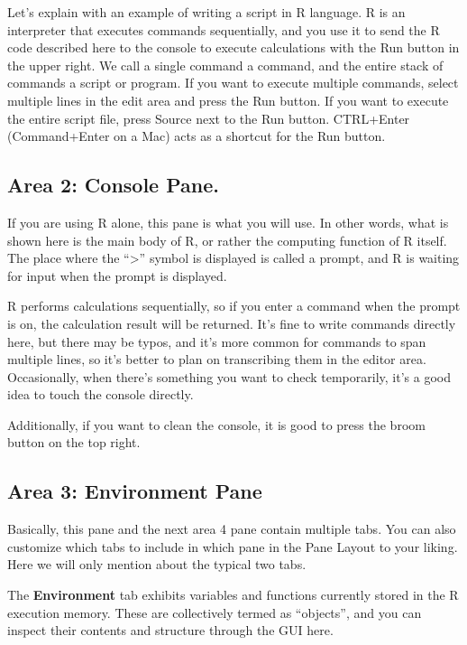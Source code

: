 \documentclass[
  a4paper,
]{book}
\begin{document}
Let's explain with an example of writing a script in R language. R is an
interpreter that executes commands sequentially, and you use it to send
the R code described here to the console to execute calculations with
the Run button in the upper right. We call a single command a command,
and the entire stack of commands a script or program. If you want to
execute multiple commands, select multiple lines in the edit area and
press the Run button. If you want to execute the entire script file,
press Source next to the Run button. CTRL+Enter (Command+Enter on a Mac)
acts as a shortcut for the Run button.

\subsection{Area 2: Console Pane.}\label{area-2-console-pane.}

If you are using R alone, this pane is what you will use. In other
words, what is shown here is the main body of R, or rather the computing
function of R itself. The place where the ``\textgreater{}'' symbol is
displayed is called a prompt, and R is waiting for input when the prompt
is displayed.

R performs calculations sequentially, so if you enter a command when the
prompt is on, the calculation result will be returned. It's fine to
write commands directly here, but there may be typos, and it's more
common for commands to span multiple lines, so it's better to plan on
transcribing them in the editor area. Occasionally, when there's
something you want to check temporarily, it's a good idea to touch the
console directly.

Additionally, if you want to clean the console, it is good to press the
broom button on the top right.

\subsection{Area 3: Environment Pane}\label{area-3-environment-pane}

Basically, this pane and the next area 4 pane contain multiple tabs. You
can also customize which tabs to include in which pane in the Pane
Layout to your liking. Here we will only mention about the typical two
tabs.

The \textbf{Environment} tab exhibits variables and functions currently
stored in the R execution memory. These are collectively termed as
``objects'', and you can inspect their contents and structure through
the GUI here.
\end{document}
